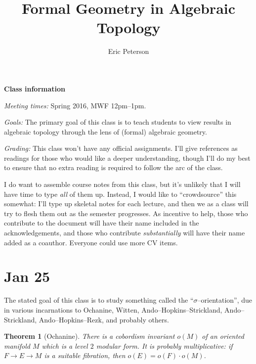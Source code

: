 \documentclass{amsart}
\title{Formal Geometry in Algebraic Topology}
\author{Eric Peterson}
\newcommand{\<}{\langle}
\renewcommand{\>}{\rangle}
\theoremstyle{plain}
\newtheorem*{theorem}{Theorem}
\theoremstyle{definition}
\theoremstyle{remark}
\begin{document}
\maketitle

\textbf{Class information}

\vspace{2\baselineskip} \noindent \textit{Meeting times: }
Spring 2016, MWF 12pm--1pm.

\vspace{2\baselineskip} \noindent \textit{Goals: }
The primary goal of this class is to teach students to view results in algebraic topology through the lens of (formal) algebraic geometry.

\vspace{2\baselineskip} \noindent \textit{Grading: }
This class won't have any official assignments. I'll give references as readings for those who would like a deeper understanding, though I'll do my best to ensure that no extra reading is required to follow the arc of the class.

I do want to assemble course notes from this class, but it's unlikely that I will have time to type \emph{all} of them up. Instead, I would like to ``crowdsource'' this somewhat: I'll type up skeletal notes for each lecture, and then we as a class will try to flesh them out as the semester progresses. As incentive to help, those who contribute to the document will have their name included in the acknowledgements, and those who contribute \emph{substantially} will have their name added as a coauthor. Everyone could use more CV items.



\newpage

\section{Jan 25}

The stated goal of this class is to study something called the ``$\sigma$--orientation'', due in various incarnations to Ochanine, Witten, Ando--Hopkins--Strickland, Ando--Strickland, Ando--Hopkins--Rezk, and probably others.




\begin{theorem}[Ochanine]
There is a cobordism invariant $o(M)$ of an oriented manifold $M$ which is a level $2$ modular form. It is probably multiplicative: if $F \to E \to M$ is a suitable fibration, then $o(E) = o(F) \cdot o(M)$.
\end{theorem}
\end{document}
